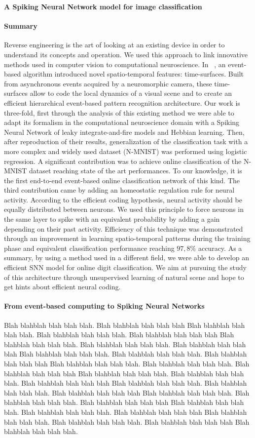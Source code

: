 \documentclass[12pt]{article}
\newcommand{\citet}[1]{\textcite{#1}}
\newcommand{\AuthorAG}{Antoine Grimaldi}
\newcommand{\AuthorLP}{Laurent Perrinet}
\newcommand{\AuthorVB}{Victor Boutin}
\newcommand{\AddressLP}{Institut de Neurosciences de la Timone (UMR 7289); Aix Marseille Univ, CNRS; Marseille, France}%
\newcommand{\AuthorSI}{Sio-Hoi Ieng}
\newcommand{\AuthorRB}{Ryad Benosman}%
\newcommand{\AddressRB}{Sorbonne Université, INSERM, CNRS, Institut de la Vision, France;}%
\newcommand{\Summary}{
Reverse engineering is the art of looking at an existing device in order to understand its concepts and operation. We used this approach to link innovative methods used in computer vision to computational neuroscience. In ~\citet{lagorce2016hots}, an event-based algorithm introduced novel spatio-temporal features: time-surfaces. Built from asynchronous events acquired by a neuromorphic camera, these time-surfaces allow to code the local dynamics of a visual scene and to create an efficient hierarchical event-based pattern recognition architecture. Our work is three-fold, first through the analysis of this existing method we were able to adapt its formalism in the computational neuroscience domain with a Spiking Neural Network of leaky integrate-and-fire models and Hebbian learning. Then, after reproduction of their results, generalization of the classification task with a more complex and widely used dataset (N-MNIST) was performed using logistic regression. A significant contribution was to achieve online classification of the N-MNIST dataset reaching state of the art performances. To our knowledge, it is the first end-to-end event-based online classification network of this kind. The third contribution came by adding an homeostatic regulation rule for neural activity. According to the efficient coding hypothesis, neural activity should be equally distributed between neurons. We used this principle to force neurons in the same layer to spike with an equivalent probability by adding a gain depending on their past activity. Efficiency of this technique was demonstrated through an improvement in learning spatio-temporal patterns during the training phase and equivalent classification performance reaching $97,8\%$ accuracy. As a summary, by using a method used in a different field, we were able to develop an efficient SNN model for online digit classification. We aim at pursuing the study of this architecture through unsupervised learning of natural scene and hope to get hints about efficient neural coding.
}
\begin{document}
{\Large\bf
A Spiking Neural Network model for image classification
}

%


\parindent 12pt

\paragraph*{Summary}
\Summary
%
\paragraph*{From event-based computing to Spiking Neural Networks}
Blah blahblah blah blah blah. Blah blahblah blah blah blah Blah blahblah blah blah blah.
Blah blahblah blah blah blah. Blah blahblah blah blah blah Blah blahblah blah blah blah.
Blah blahblah blah blah blah. Blah blahblah blah blah blah Blah blahblah blah blah blah.
Blah blahblah blah blah blah. Blah blahblah blah blah blah Blah blahblah blah blah blah.
Blah blahblah blah blah blah. Blah blahblah blah blah blah Blah blahblah blah blah blah.
Blah blahblah blah blah blah. Blah blahblah blah blah blah Blah blahblah blah blah blah.
Blah blahblah blah blah blah. Blah blahblah blah blah blah Blah blahblah blah blah blah.
Blah blahblah blah blah blah. Blah blahblah blah blah blah Blah blahblah blah blah blah.
Blah blahblah blah blah blah. Blah blahblah blah blah blah Blah blahblah blah blah blah.
Blah blahblah blah blah blah. Blah blahblah blah blah blah Blah blahblah blah blah blah.
\end{document}
